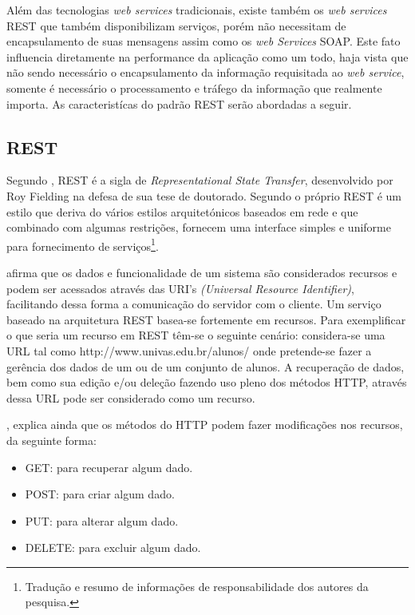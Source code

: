 	\par Além das tecnologias \textit{web services} tradicionais, existe também os
\textit{web services} REST que também disponibilizam serviços, porém não
necessitam de encapsulamento de suas mensagens assim como os \textit{web
Services} SOAP. Este fato influencia diretamente na performance da aplicação
como um todo, haja vista que não sendo necessário o encapsulamento da informação
requisitada ao \textit{web service}, somente é necessário o processamento e
tráfego da informação que realmente importa. As caracteristícas do padrão REST
serão abordadas a seguir.

	\subsection{REST}
	
	\par Segundo , REST é a sigla de
\textit{Representational State Transfer}, desenvolvido por Roy Fielding na
defesa de sua tese de doutorado. Segundo o próprio 
REST é um estilo que deriva do vários estilos arquitetónicos baseados em rede
e  que combinado com algumas restrições, fornecem uma interface simples e
uniforme para fornecimento de serviços\footnote{Tradução e resumo de
informações de responsabilidade dos autores da pesquisa.}.
	
	\par {} afirma que os dados e funcionalidade de um sistema
são considerados recursos e podem ser acessados através das URI's
\textit{(Universal Resource Identifier)}, facilitando dessa forma a comunicação
do servidor com o cliente. Um serviço baseado na arquitetura REST
basea-se fortemente em recursos. Para exemplificar o que seria um recurso em
REST têm-se o seguinte cenário: considera-se uma URL tal como 
http://www.univas.edu.br/alunos/ onde pretende-se fazer a gerência dos dados
de um ou de um conjunto de alunos. A recuperação de dados, bem como sua edição
e/ou deleção fazendo uso pleno dos métodos HTTP, através dessa URL pode ser
considerado como um recurso.
	\par {}, explica ainda que os métodos do HTTP podem fazer
modificações nos recursos, da seguinte forma:
	
	 \begin{itemize}
	   \item GET: para recuperar algum dado. 
	   \item POST: para criar algum dado.
	   \item PUT: para alterar algum dado. 
	   \item DELETE: para excluir algum dado. 
	 \end{itemize}
	 	
